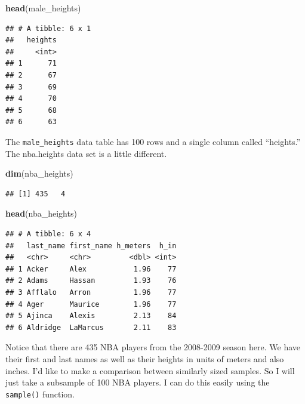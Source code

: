 \documentclass[openany]{book}
\newenvironment{Shaded}{\begin{snugshade}}{\end{snugshade}}
\newcommand{\CommentTok}[1]{\textcolor[rgb]{0.56,0.35,0.01}{\textit{#1}}}
\newcommand{\DecValTok}[1]{\textcolor[rgb]{0.00,0.00,0.81}{#1}}
\newcommand{\KeywordTok}[1]{\textcolor[rgb]{0.13,0.29,0.53}{\textbf{#1}}}
\newcommand{\NormalTok}[1]{#1}
\newcommand{\OperatorTok}[1]{\textcolor[rgb]{0.81,0.36,0.00}{\textbf{#1}}}
\newcommand{\StringTok}[1]{\textcolor[rgb]{0.31,0.60,0.02}{#1}}
\begin{document}
\begin{Shaded}
\begin{Highlighting}[]
\KeywordTok{head}\NormalTok{(male_heights)}
\end{Highlighting}
\end{Shaded}

\begin{verbatim}
## # A tibble: 6 x 1
##   heights
##     <int>
## 1      71
## 2      67
## 3      69
## 4      70
## 5      68
## 6      63
\end{verbatim}

The \texttt{male\_heights} data table has 100 rows and a single column called ``heights.'' The nba.heights data set is a little different.

\begin{Shaded}
\begin{Highlighting}[]
\KeywordTok{dim}\NormalTok{(nba_heights)}
\end{Highlighting}
\end{Shaded}

\begin{verbatim}
## [1] 435   4
\end{verbatim}

\begin{Shaded}
\begin{Highlighting}[]
\KeywordTok{head}\NormalTok{(nba_heights)}
\end{Highlighting}
\end{Shaded}

\begin{verbatim}
## # A tibble: 6 x 4
##   last_name first_name h_meters  h_in
##   <chr>     <chr>         <dbl> <int>
## 1 Acker     Alex           1.96    77
## 2 Adams     Hassan         1.93    76
## 3 Afflalo   Arron          1.96    77
## 4 Ager      Maurice        1.96    77
## 5 Ajinca    Alexis         2.13    84
## 6 Aldridge  LaMarcus       2.11    83
\end{verbatim}

Notice that there are 435 NBA players from the 2008-2009 season here. We have their first and last names as well as their heights in units of meters and also inches. I'd like to make a comparison between similarly sized samples. So I will just take a subsample of 100 NBA players. I can do this easily using the \texttt{sample()} function.

\begin{Shaded}
\end{Shaded}
\end{document}
